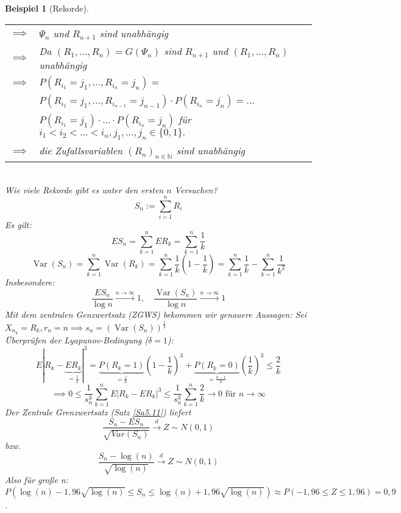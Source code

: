 \documentclass[a4paper,11pt]{scrbook}
\newcommand{\N}{{\mathbb N}}
\DeclareMathOperator{\var}{Var}
\def\folgt{\ensuremath{\implies}}
\def\dto{\stackrel{d}{\rightarrow}}
\newtheorem{Bsp}{Beispiel}[chapter]
\theoremstyle{nonumberplain}
\begin{document}
\begin{Bsp}[Rekorde]
\begin{tabular}[b]{rp{}}
$\folgt$ & $\Psi_n$ und $R_{n+1}$ sind unabhängig\\
$\folgt$ & Da $(R_1, \ldots, R_n) = G(\Psi_n)$ sind $R_{n+1}$ und $(R_1,\ldots,R_n)$ unabhängig\\
$\folgt$& $P(R_{i_1}=j_1,\ldots,R_{i_n}=j_n) =$\\
&$P(R_{i_1}=j_1,\ldots,R_{i_{n-1}}=j_{n-1})\cdot P(R_{i_n}=j_n) = \ldots$\\
&$P(R_{i_1}=j_1)\cdot\ldots\cdot P(R_{i_n} = j_n)$ für $i_1<i_2<\ldots<i_n, j_1,\ldots,j_n\in\{0,1\}.$\\
$\folgt$ & die Zufallsvariablen $(R_n)_{n\in\N}$ sind unabhängig
\end{tabular}\\
Wie viele Rekorde gibt es unter den ersten $n$ Versuchen?
$$S_n:=\sum_{i=1}^n R_i$$
Es gilt:
$$ES_n = \sum_{k=1}^n ER_k = \sum_{k=1}^n \frac 1 k$$
$$\var(S_n) = \sum_{k=1}^n\var(R_k) = \sum_{k=1}^n\frac 1 k (1 - \frac 1 k ) = \sum_{k=1}^n\frac 1 k - \sum_{k=1}^n \frac 1 {k^2}$$
Insbesondere:
$$\frac{ES_n}{\log n}\stackrel{n\to\infty}{\to}1,\quad\frac{\var(S_n)}{\log n}\stackrel{n\to\infty}{\to}1$$
Mit dem zentralen Genzwertsatz (ZGWS) bekommen wir genauere Aussagen: Sei $X_{n_k} = R_k, r_n = n \folgt s_n = \left(\var(S_n)\right)^{\frac 1 2}$\\
Überprüfen der Lyapunov-Bedingung ($\delta = 1$):
$$E|R_k - \underbrace{ER_k}_{= \frac 1 k}|^3 = \underbrace{P(R_k=1)}_{=\frac 1 k}(1-\frac 1 k )^3 + \underbrace{P(R_k = 0)}_{=\frac {k-1} k}\left(\frac 1 k\right)^3\le\frac 2 k$$
$$\folgt 0\le\frac 1 {s_n^3}\sum_{k=1}^n E|R_k-ER_k|^3\le\frac 1 {s_n^3}\sum_{k=1}^n\frac 2 k\to 0 \text{ für } n\to\infty$$
Der Zentrale Grenzwertsatz (Satz \ref{Sa5.11}) liefert $$\frac{S_n - ES_n}{\sqrt{Var (S_n)}} \dto Z\sim N(0,1)$$ bzw. $$\frac{S_n - \log(n)}{\sqrt{\log(n)}} \dto Z\sim N(0,1)$$
Also für große n: $P(\log(n) - 1,96\sqrt{\log(n)} \leq S_n \leq \log(n) + 1,96\sqrt{\log(n)}) \approx P(-1,96 \leq Z \leq 1,96) = 0,9$.
\end{Bsp}
\end{document}
